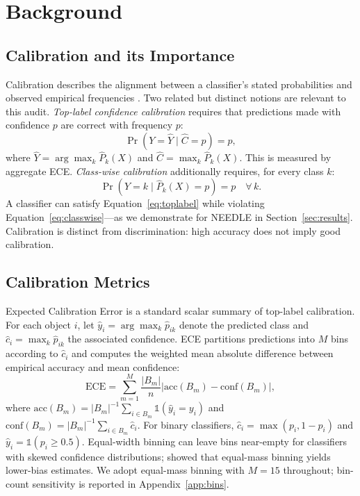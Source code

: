 \documentclass[twocolumn]{aastex631}
\begin{document}
\section{Background}\label{sec:background}

\subsection{Calibration and its Importance}\label{sec:calibration}

Calibration describes the alignment between a classifier's stated
probabilities and observed empirical frequencies \citep{dawid1982}.
Two related but distinct notions are relevant to this audit.
\textit{Top-label confidence calibration} \citep{guo2017} requires
that predictions made with confidence $p$ are correct with frequency $p$:
%
\begin{equation}
    \Pr(Y = \hat{Y} \mid \hat{C} = p) = p,
    \label{eq:toplabel}
\end{equation}
%
where $\hat{Y} = \arg\max_k \hat{P}_k(X)$ and
$\hat{C} = \max_k \hat{P}_k(X)$. This is measured by aggregate ECE.
\textit{Class-wise calibration} \citep{nixon2019} additionally
requires, for every class $k$:
%
\begin{equation}
    \Pr(Y = k \mid \hat{P}_k(X) = p) = p \quad \forall\, k.
    \label{eq:classwise}
\end{equation}
%
A classifier can satisfy Equation~\ref{eq:toplabel} while violating
Equation~\ref{eq:classwise}---as we demonstrate for NEEDLE in
Section~\ref{sec:results}. Calibration is distinct from
discrimination: high accuracy does not imply good calibration.

\subsection{Calibration Metrics}\label{sec:metrics}

Expected Calibration Error \citep[ECE;][]{naeini2015} is a
standard scalar summary of top-label calibration. For each object
$i$, let $\hat{y}_i = \arg\max_k \hat{p}_{ik}$ denote the predicted
class and $\hat{c}_i = \max_k \hat{p}_{ik}$ the associated
confidence. ECE partitions predictions into $M$ bins according to
$\hat{c}_i$ and computes the weighted mean absolute difference
between empirical accuracy and mean confidence:
%
\begin{equation}
    \text{ECE} = \sum_{m=1}^{M} \frac{|B_m|}{n}
    \left| \text{acc}(B_m) - \text{conf}(B_m) \right|,
    \label{eq:ece}
\end{equation}
%
where $\text{acc}(B_m) =
|B_m|^{-1}\sum_{i\in B_m}\mathbb{1}(\hat{y}_i=y_i)$ and
$\text{conf}(B_m)=|B_m|^{-1}\sum_{i\in B_m}\hat{c}_i$.
For binary classifiers, $\hat{c}_i=\max(p_i,1-p_i)$ and
$\hat{y}_i=\mathbb{1}(p_i\geq 0.5)$. Equal-width binning can leave
bins near-empty for classifiers with skewed confidence distributions;
\citet{roelofs2022} showed that equal-mass binning yields lower-bias
estimates. We adopt equal-mass binning with $M=15$ throughout;
bin-count sensitivity is reported in Appendix~\ref{app:bins}.
\end{document}
